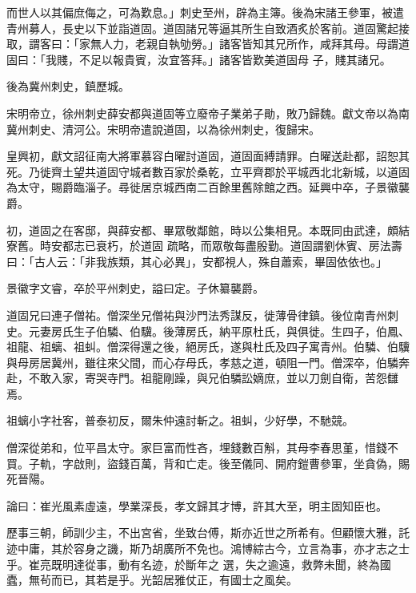 \begin{pinyinscope}
 而世人以其偏庶侮之，可為歎息。」刺史至州，辟為主簿。後為宋諸王參軍，被遣青州募人，長史以下並詣道固。道固諸兄等逼其所生自致酒炙於客前。道固驚起接取，謂客曰：「家無人力，老親自執劬勞。」諸客皆知其兄所作，咸拜其母。母謂道固曰：「我賤，不足以報貴賓，汝宜答拜。」諸客皆歎美道固母
 子，賤其諸兄。



 後為冀州刺史，鎮歷城。



 宋明帝立，徐州刺史薛安都與道固等立廢帝子業弟子勛，敗乃歸魏。獻文帝以為南冀州刺史、清河公。宋明帝遣說道固，以為徐州刺史，復歸宋。



 皇興初，獻文詔征南大將軍慕容白曜討道固，道固面縛請罪。白曜送赴都，詔恕其死。乃徙齊土望共道固守城者數百家於桑乾，立平齊郡於平城西北北新城，以道固為太守，賜爵臨淄子。尋徙居京城西南二百餘里舊除館之西。延興中卒，子景徽襲爵。



 初，道固之在客邸，與薛安都、畢眾敬鄰館，時以公集相見。本既同由武達，頗結寮舊。時安都志已衰朽，於道固
 疏略，而眾敬每盡殷勤。道固謂劉休賓、房法壽曰：「古人云：「非我族類，其心必異」，安都視人，殊自蕭索，畢固依依也。」



 景徽字文睿，卒於平州刺史，謚曰定。子休纂襲爵。



 道固兄曰連子僧祐。僧深坐兄僧祐與沙門法秀謀反，徙薄骨律鎮。後位南青州刺史。元妻房氏生子伯驎、伯驥。後薄房氏，納平原杜氏，與俱徙。生四子，伯鳳、祖龍、祖螭、祖虯。僧深得還之後，絕房氏，遂與杜氏及四子寓青州。伯驎、伯驥與母房居冀州，雖往來父間，而心存母氏，孝慈之道，頓阻一門。僧深卒，伯驎奔赴，不敢入家，寄哭寺門。祖龍剛躁，與兄伯驎訟嫡庶，並以刀劍自衛，苦怨讎
 焉。



 祖螭小字社客，普泰初反，爾朱仲遠討斬之。祖虯，少好學，不馳競。



 僧深從弟和，位平昌太守。家巨富而性吝，埋錢數百斛，其母李春思堇，惜錢不買。子軌，字啟則，盜錢百萬，背和亡走。後至儀同、開府鎧曹參軍，坐貪偽，賜死晉陽。



 論曰：崔光風素虛遠，學業深長，孝文歸其才博，許其大至，明主固知臣也。



 歷事三朝，師訓少主，不出宮省，坐致台傅，斯亦近世之所希有。但顧懷大雅，託迹中庸，其於容身之譏，斯乃胡廣所不免也。鴻博綜古今，立言為事，亦才志之士乎。崔亮既明達從事，動有名迹，於斷年之
 選，失之逾遠，救弊未聞，終為國蠹，無茍而已，其若是乎。光韶居雅仗正，有國士之風矣。



\end{pinyinscope}